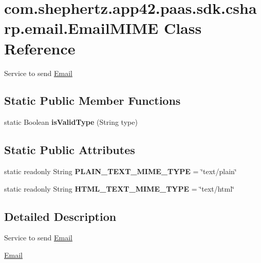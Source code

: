 \hypertarget{classcom_1_1shephertz_1_1app42_1_1paas_1_1sdk_1_1csharp_1_1email_1_1_email_m_i_m_e}{\section{com.\+shephertz.\+app42.\+paas.\+sdk.\+csharp.\+email.\+Email\+M\+I\+M\+E Class Reference}
\label{classcom_1_1shephertz_1_1app42_1_1paas_1_1sdk_1_1csharp_1_1email_1_1_email_m_i_m_e}
}


Service to send \hyperlink{classcom_1_1shephertz_1_1app42_1_1paas_1_1sdk_1_1csharp_1_1email_1_1_email}{Email}  


\subsection*{Static Public Member Functions}
\begin{DoxyCompactItemize}
\item 
\hypertarget{classcom_1_1shephertz_1_1app42_1_1paas_1_1sdk_1_1csharp_1_1email_1_1_email_m_i_m_e_a5e8757ac4c4107ebacba454657cb4638}{static Boolean {\bfseries is\+Valid\+Type} (String type)}\label{classcom_1_1shephertz_1_1app42_1_1paas_1_1sdk_1_1csharp_1_1email_1_1_email_m_i_m_e_a5e8757ac4c4107ebacba454657cb4638}

\end{DoxyCompactItemize}
\subsection*{Static Public Attributes}
\begin{DoxyCompactItemize}
\item 
\hypertarget{classcom_1_1shephertz_1_1app42_1_1paas_1_1sdk_1_1csharp_1_1email_1_1_email_m_i_m_e_a1a8e135d785417ac1962a6eff9f4d84d}{static readonly String {\bfseries P\+L\+A\+I\+N\+\_\+\+T\+E\+X\+T\+\_\+\+M\+I\+M\+E\+\_\+\+T\+Y\+P\+E} = \char`\"{}text/plain\char`\"{}}\label{classcom_1_1shephertz_1_1app42_1_1paas_1_1sdk_1_1csharp_1_1email_1_1_email_m_i_m_e_a1a8e135d785417ac1962a6eff9f4d84d}

\item 
\hypertarget{classcom_1_1shephertz_1_1app42_1_1paas_1_1sdk_1_1csharp_1_1email_1_1_email_m_i_m_e_ad6303576667843c29d3958d420df6c2a}{static readonly String {\bfseries H\+T\+M\+L\+\_\+\+T\+E\+X\+T\+\_\+\+M\+I\+M\+E\+\_\+\+T\+Y\+P\+E} = \char`\"{}text/html\char`\"{}}\label{classcom_1_1shephertz_1_1app42_1_1paas_1_1sdk_1_1csharp_1_1email_1_1_email_m_i_m_e_ad6303576667843c29d3958d420df6c2a}

\end{DoxyCompactItemize}


\subsection{Detailed Description}
Service to send \hyperlink{classcom_1_1shephertz_1_1app42_1_1paas_1_1sdk_1_1csharp_1_1email_1_1_email}{Email} 

\hyperlink{classcom_1_1shephertz_1_1app42_1_1paas_1_1sdk_1_1csharp_1_1email_1_1_email_service}{Email} 